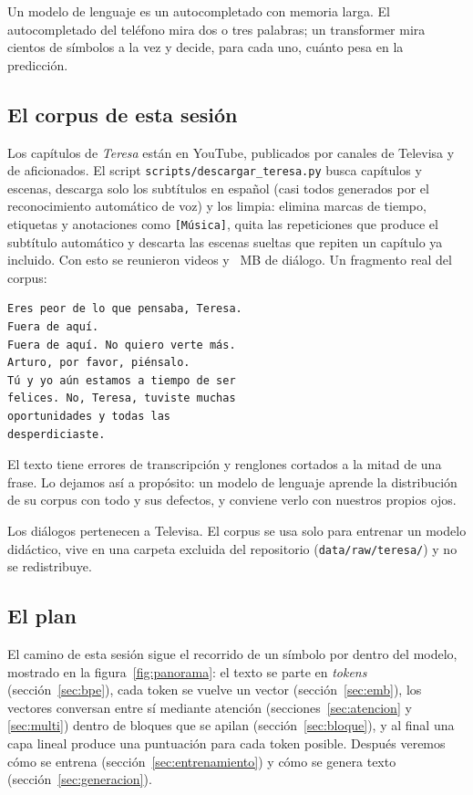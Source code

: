 \documentclass[11pt,letterpaper,oneside]{report}
\begin{document}
\begin{intuicion}
Un modelo de lenguaje es un autocompletado con memoria larga. El autocompletado del teléfono mira dos o tres palabras; un transformer mira cientos de símbolos a la vez y decide, para cada uno, cuánto pesa en la predicción.
\end{intuicion}

\subsection{El corpus de esta sesión}

Los capítulos de \emph{Teresa} están en YouTube, publicados por canales de Televisa y de aficionados. El script \texttt{scripts/descargar\_teresa.py} busca capítulos y escenas, descarga solo los subtítulos en español (casi todos generados por el reconocimiento automático de voz) y los limpia: elimina marcas de tiempo, etiquetas y anotaciones como \texttt{[Música]}, quita las repeticiones que produce el subtítulo automático y descarta las escenas sueltas que repiten un capítulo ya incluido. Con esto se reunieron \mgCapitulos{} videos y \mgCorpusMB{}~MB de diálogo. Un fragmento real del corpus:

\begin{lstlisting}[language={},numbers=none,basicstyle=\ttfamily\footnotesize]
Eres peor de lo que pensaba, Teresa.
Fuera de aquí.
Fuera de aquí. No quiero verte más.
Arturo, por favor, piénsalo.
Tú y yo aún estamos a tiempo de ser
felices. No, Teresa, tuviste muchas
oportunidades y todas las
desperdiciaste.
\end{lstlisting}

El texto tiene errores de transcripción y renglones cortados a la mitad de una frase. Lo dejamos así a propósito: un modelo de lenguaje aprende la distribución de su corpus con todo y sus defectos, y conviene verlo con nuestros propios ojos.

\begin{nota}[Derechos]
Los diálogos pertenecen a Televisa. El corpus se usa solo para entrenar un modelo didáctico, vive en una carpeta excluida del repositorio (\texttt{data/raw/teresa/}) y no se redistribuye.
\end{nota}

\subsection{El plan}

El camino de esta sesión sigue el recorrido de un símbolo por dentro del modelo, mostrado en la figura~\ref{fig:panorama}: el texto se parte en \emph{tokens} (sección~\ref{sec:bpe}), cada token se vuelve un vector (sección~\ref{sec:emb}), los vectores conversan entre sí mediante atención (secciones~\ref{sec:atencion} y \ref{sec:multi}) dentro de bloques que se apilan (sección~\ref{sec:bloque}), y al final una capa lineal produce una puntuación para cada token posible. Después veremos cómo se entrena (sección~\ref{sec:entrenamiento}) y cómo se genera texto (sección~\ref{sec:generacion}).
\end{document}
